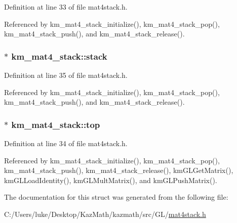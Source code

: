 Definition at line 33 of file mat4stack.h.

Referenced by km\_\-mat4\_\-stack\_\-initialize(), km\_\-mat4\_\-stack\_\-pop(), km\_\-mat4\_\-stack\_\-push(), and km\_\-mat4\_\-stack\_\-release().\hypertarget{structkm__mat4__stack_a8b2b968718d212c80d7923d9de6a0a8}{
\subsubsection[{stack}]{$\ast$ {\bf km\_\-mat4\_\-stack::stack}}}
\label{structkm__mat4__stack_a8b2b968718d212c80d7923d9de6a0a8}




Definition at line 35 of file mat4stack.h.

Referenced by km\_\-mat4\_\-stack\_\-initialize(), km\_\-mat4\_\-stack\_\-pop(), km\_\-mat4\_\-stack\_\-push(), and km\_\-mat4\_\-stack\_\-release().\hypertarget{structkm__mat4__stack_487ba8aa0a0176eb21899bd8bc38f153}{
\subsubsection[{top}]{$\ast$ {\bf km\_\-mat4\_\-stack::top}}}
\label{structkm__mat4__stack_487ba8aa0a0176eb21899bd8bc38f153}




Definition at line 34 of file mat4stack.h.

Referenced by km\_\-mat4\_\-stack\_\-initialize(), km\_\-mat4\_\-stack\_\-pop(), km\_\-mat4\_\-stack\_\-push(), km\_\-mat4\_\-stack\_\-release(), kmGLGetMatrix(), kmGLLoadIdentity(), kmGLMultMatrix(), and kmGLPushMatrix().

The documentation for this struct was generated from the following file:\begin{CompactItemize}
\item 
C:/Users/luke/Desktop/KazMath/kazmath/src/GL/\hyperlink{mat4stack_8h}{mat4stack.h}\end{CompactItemize}
